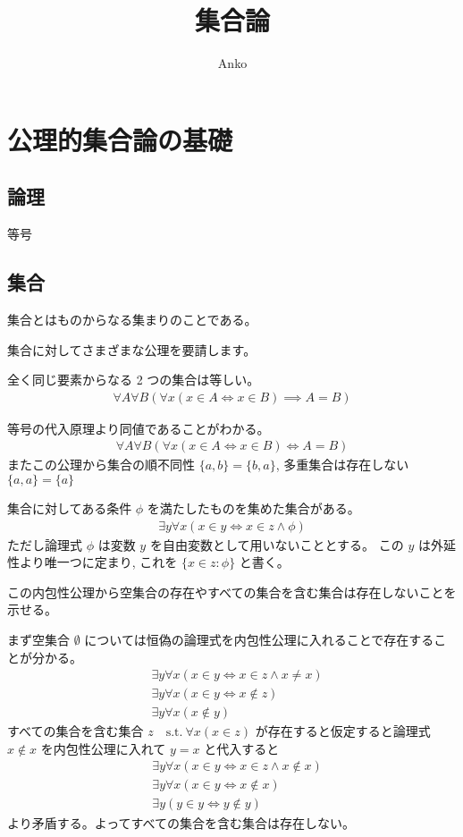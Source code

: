 \documentclass[uplatex,dvipdfmx,a4paper,11pt]{jlreq}
\title{集合論}
\author{Anko}
\theoremstyle{definition}
\begin{document}
\maketitle
\tableofcontents
\clearpage

\section{公理的集合論の基礎}
\subsection{論理}
等号
\subsection{集合}
\begin{definition}[集合]
  集合とはものからなる集まりのことである。
\end{definition}
集合に対してさまざまな公理を要請します。

\begin{axiom}[外延性公理]
  全く同じ要素からなる 2 つの集合は等しい。
  \begin{align}
    \forall A\forall B(\forall x(x\in A\iff x\in B)\implies A=B)
  \end{align}
\end{axiom}
等号の代入原理より同値であることがわかる。
\begin{align}
  \forall A\forall B(\forall x(x\in A\iff x\in B)\iff A=B)
\end{align}
またこの公理から集合の順不同性 $\{a, b\} = \{b, a\}$, 多重集合は存在しない $\{a, a\} = \{a\}$

\begin{axiom}[内包性図式]
  集合に対してある条件 $\phi$ を満たしたものを集めた集合がある。
  \begin{align}
    \exists y\forall x(x\in y\iff x\in z\land \phi)
  \end{align}
  ただし論理式 $\phi$ は変数 $y$ を自由変数として用いないこととする。
  この $y$ は外延性より唯一つに定まり, これを $\{x\in z:\phi\}$ と書く。
\end{axiom}
この内包性公理から空集合の存在やすべての集合を含む集合は存在しないことを示せる。

まず空集合 $\emptyset$ については恒偽の論理式を内包性公理に入れることで存在することが分かる。
\begin{align}
   & \exists y\forall x(x\in y\iff x\in z\land x\neq x) \\
   & \exists y\forall x(x\in y\iff x\notin z)           \\
   & \exists y\forall x(x\notin y)
\end{align}
すべての集合を含む集合 $z \quad\mathrm{s.t.}\ \forall x(x\in z)$ が存在すると仮定すると論理式 $x\notin x$ を内包性公理に入れて $y = x$ と代入すると
\begin{align}
   & \exists y\forall x(x\in y\iff x\in z\land x\notin x) \\
   & \exists y\forall x(x\in y\iff x\notin x)             \\
   & \exists y(y\in y\iff y\notin y)
\end{align}
より矛盾する。よってすべての集合を含む集合は存在しない。
\end{document}
